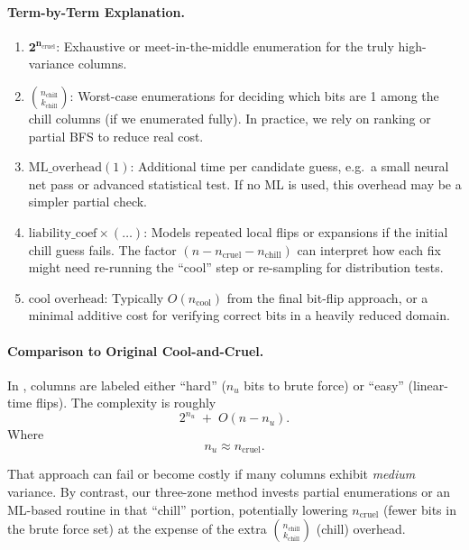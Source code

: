 \documentclass[11pt]{article}
\begin{document}
\paragraph{Term-by-Term Explanation.}
\begin{enumerate}
  \item \(\mathbf{2^{n_{\mathrm{cruel}}}}\): 
  Exhaustive or meet-in-the-middle enumeration for the truly high-variance columns.

  \item \(\binom{n_{\mathrm{chill}}}{k_{\mathrm{chill}}}\):
  Worst-case enumerations for deciding which bits are 1 among the chill columns (if we enumerated fully). In practice, we rely on ranking or partial BFS to reduce real cost.

  \item \(\mathrm{ML\_overhead}(1)\):
  Additional time per candidate guess, e.g.\ a small neural net pass or advanced statistical test. 
  If no ML is used, this overhead may be a simpler partial check.

  \item \(\mathrm{liability\_coef}\times(\dots)\):
  Models repeated local flips or expansions if the initial chill guess fails. The factor \((n - n_{\mathrm{cruel}} - n_{\mathrm{chill}})\) can interpret how each fix might need re-running the “cool” step or re-sampling for distribution tests.

  \item \(\text{cool overhead}\):
  Typically $O(n_{\mathrm{cool}})$ from the final bit-flip approach, or a minimal additive cost for verifying correct bits in a heavily reduced domain.
\end{enumerate}

\paragraph{Comparison to Original Cool-and-Cruel.}
In \cite{cool-and-cruel}, columns are labeled either ``hard'' ($n_u$ bits to brute force) or ``easy'' (linear-time flips). The complexity is roughly
\[
  2^{n_{u}} \;+\; O(n - n_u).
\]
Where \[
n_u \approx n_{\mathrm{cruel}}.
\]

That approach can fail or become costly if many columns exhibit \emph{medium} variance. By contrast, our three-zone method invests partial enumerations or an ML-based routine in that “chill” portion, potentially lowering $n_{\mathrm{cruel}}$ (fewer bits in the brute force set) at the expense of the extra $\binom{n_{\mathrm{chill}}}{k_{\mathrm{chill}}}$ (chill) overhead.
\end{document}
